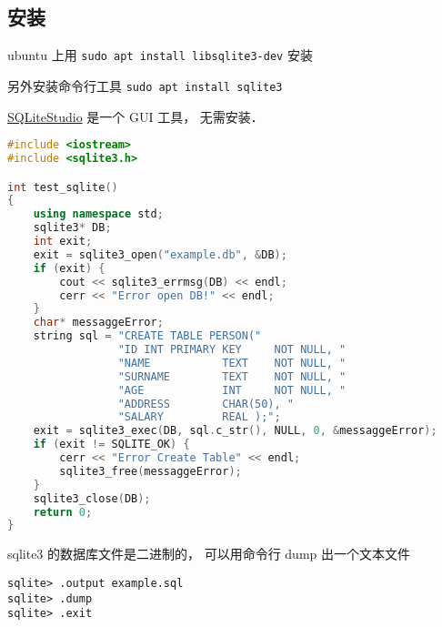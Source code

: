 
\begin{issues}
\issueDraft
\end{issues}


\subsection{安装}
ubuntu 上用 \verb|sudo apt install libsqlite3-dev| 安装

另外安装命令行工具 \verb|sudo apt install sqlite3|

\href{https://sqlitestudio.pl/}{SQLiteStudio} 是一个 GUI 工具， 无需安装．

\begin{lstlisting}[language=cpp]
#include <iostream>
#include <sqlite3.h>

int test_sqlite()
{
	using namespace std;
    sqlite3* DB;
    int exit;
    exit = sqlite3_open("example.db", &DB);
    if (exit) {
		cout << sqlite3_errmsg(DB) << endl;
        cerr << "Error open DB!" << endl;
    }
	char* messaggeError;
	string sql = "CREATE TABLE PERSON("
                 "ID INT PRIMARY KEY     NOT NULL, "
                 "NAME           TEXT    NOT NULL, "
                 "SURNAME        TEXT    NOT NULL, "
                 "AGE            INT     NOT NULL, "
                 "ADDRESS        CHAR(50), "
                 "SALARY         REAL );";
	exit = sqlite3_exec(DB, sql.c_str(), NULL, 0, &messaggeError);
    if (exit != SQLITE_OK) {
        cerr << "Error Create Table" << endl;
        sqlite3_free(messaggeError);
    }
    sqlite3_close(DB);
    return 0;
}
\end{lstlisting}

sqlite3 的数据库文件是二进制的， 可以用命令行 dump 出一个文本文件
\begin{lstlisting}
sqlite> .output example.sql
sqlite> .dump
sqlite> .exit
\end{lstlisting}
